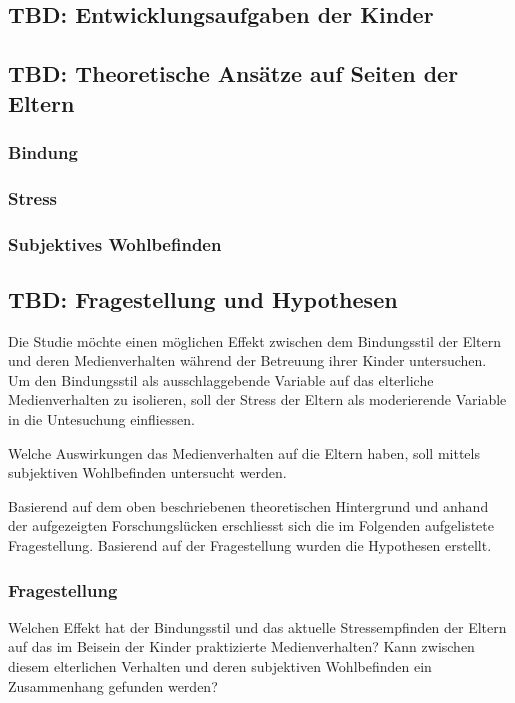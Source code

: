 \subsection{TBD: Entwicklungsaufgaben der Kinder} \label{sec:Entwicklungsaufgaben}

\subsection{TBD: Theoretische Ansätze auf Seiten der Eltern} \label{sec:TheretischeAnsätze}

\subsubsection{Bindung}\label{sec:Bindung}

\subsubsection{Stress}\label{sec:Stress}

\subsubsection{Subjektives Wohlbefinden}\label{sec:Swb}






\subsection{TBD: Fragestellung und Hypothesen} \label{sec:Fragestellung}
Die Studie möchte einen möglichen Effekt zwischen dem Bindungsstil der Eltern und deren Medienverhalten während der Betreuung ihrer Kinder untersuchen. Um den Bindungsstil als ausschlaggebende Variable auf das elterliche Medienverhalten zu isolieren, soll der Stress der Eltern als moderierende Variable in die Untesuchung einfliessen.

Welche Auswirkungen das Medienverhalten auf die Eltern haben, soll mittels subjektiven Wohlbefinden  untersucht werden. 

Basierend auf dem oben beschriebenen theoretischen Hintergrund und anhand der aufgezeigten Forschungslücken erschliesst sich die im Folgenden aufgelistete Fragestellung. Basierend auf der Fragestellung wurden die Hypothesen erstellt.
\subsubsection{Fragestellung} 
Welchen Effekt hat der Bindungsstil und das aktuelle Stressempfinden der Eltern auf das im Beisein der Kinder praktizierte Medienverhalten? Kann zwischen diesem elterlichen Verhalten und deren subjektiven Wohlbefinden ein Zusammenhang gefunden werden?
